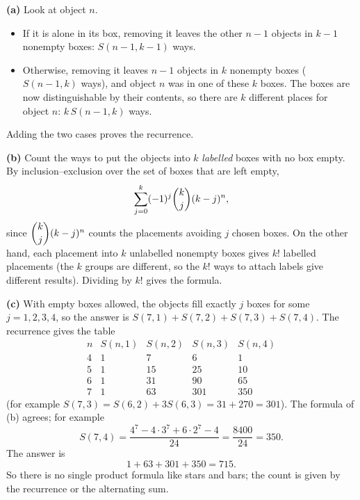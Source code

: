 \textbf{(a)} Look at object $n$.
\begin{itemize}
\item If it is alone in its box, removing it leaves the other $n-1$ objects in $k-1$ nonempty boxes: $S(n-1,k-1)$ ways.
\item Otherwise, removing it leaves $n-1$ objects in $k$ nonempty boxes ($S(n-1,k)$ ways), and object $n$ was in one of these $k$ boxes. The boxes are now distinguishable by their contents, so there are $k$ different places for object $n$: $k\,S(n-1,k)$ ways.
\end{itemize}
Adding the two cases proves the recurrence.

\textbf{(b)} Count the ways to put the objects into $k$ \emph{labelled} boxes with no box empty. By inclusion--exclusion over the set of boxes that are left empty,
\[\sum_{j=0}^{k}(-1)^j\dbinom kj(k-j)^n,\]
since $\dbinom kj(k-j)^n$ counts the placements avoiding $j$ chosen boxes. On the other hand, each placement into $k$ unlabelled nonempty boxes gives $k!$ labelled placements (the $k$ groups are different, so the $k!$ ways to attach labels give different results). Dividing by $k!$ gives the formula.

\textbf{(c)} With empty boxes allowed, the objects fill exactly $j$ boxes for some $j=1,2,3,4$, so the answer is $S(7,1)+S(7,2)+S(7,3)+S(7,4)$. The recurrence gives the table
\[\begin{array}{c|ccccc}
n & S(n,1) & S(n,2) & S(n,3) & S(n,4)\\\hline
4 & 1 & 7 & 6 & 1\\
5 & 1 & 15 & 25 & 10\\
6 & 1 & 31 & 90 & 65\\
7 & 1 & 63 & 301 & 350
\end{array}\]
(for example $S(7,3)=S(6,2)+3S(6,3)=31+270=301$). The formula of (b) agrees; for example
\[S(7,4)=\dfrac{4^7-4\cdot3^7+6\cdot2^7-4}{24}=\dfrac{8400}{24}=350.\]
The answer is
\[1+63+301+350=\boxed{715}.\]
So there is no single product formula like stars and bars; the count is given by the recurrence or the alternating sum.
